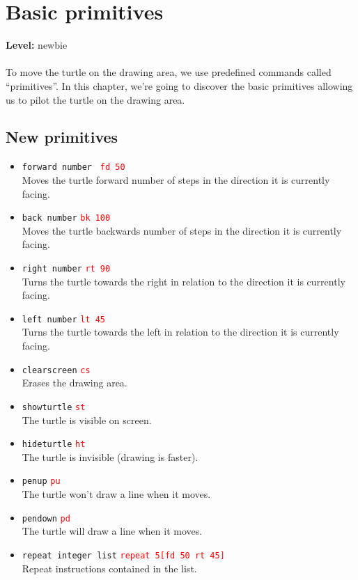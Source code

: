 \chapter{Basic primitives}
{ }\hfill\textbf{Level:} newbie\\ \\
\noindent
To move the turtle on the drawing area, we use predefined commands called ``primitives''. In this chapter, we're going to discover the basic primitives allowing us to pilot the turtle on the drawing area.
\section{New primitives}
\begin{itemize}
\item \texttt{forward number }\hspace {4cm } \textcolor{red}{ \texttt{fd 50}}\\
 Moves the turtle forward number of steps in the direction it is currently facing.
\item \texttt{back number}\hspace {4cm } \textcolor{red}{ \texttt{bk 100}}\\
Moves the turtle backwards number of steps in the direction it is currently facing.
\item \texttt{right number}\hspace {4cm } \textcolor{red}{\texttt{rt 90}}\\
 Turns the turtle towards the right in relation to the direction it is currently facing.
\item \texttt{left number}\hspace {4cm } \textcolor{red}{ \texttt{lt 45}}\\
 Turns the turtle  towards the left in relation to the direction it is currently facing.
\item \texttt{clearscreen}\hspace {4cm } \textcolor{red}{ \texttt{cs}}\\
Erases the drawing area.
\item \texttt{showturtle}\hspace {4cm } \textcolor{red}{ \texttt{st}}\\
The turtle is visible on screen.
\item \texttt{hideturtle}\hspace {4cm } \textcolor{red}{ \texttt{ht}}\\
The turtle is invisible (drawing is faster).
\item \texttt{penup}\hspace {4cm } \textcolor{red}{ \texttt{pu}}\\
The turtle won't draw a line when it moves.
\item \texttt{pendown}\hspace {4cm } \textcolor{red}{ \texttt{pd}}\\
The turtle will draw a line when it moves.
\item \texttt{repeat integer list}\hspace {4cm } \textcolor{red}{ \texttt{repeat 5[fd 50 rt 45]}}\\
Repeat instructions contained in the list.
\end{itemize}
